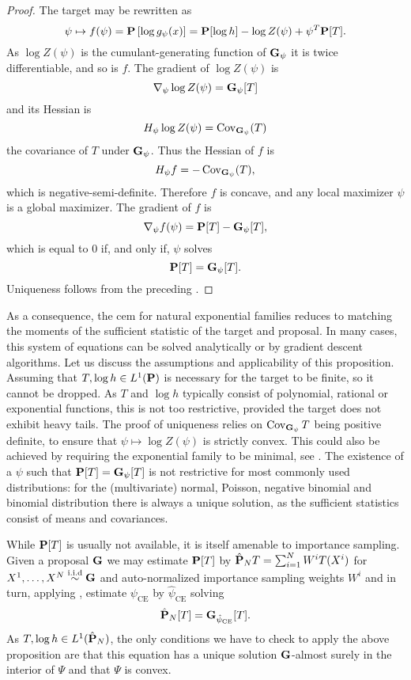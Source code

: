 \begin{proof}
    The target may be rewritten as
    $$
    \psi \mapsto f(\psi) = \P \left[\log g_{\psi}(x)\right]= \P [\log h] - \log Z(\psi) + \psi^{T} \P [T].
    $$
    As $\log Z(\psi)$ is the cumulant-generating function of $\G_{\psi}$ it is twice differentiable, and so is $f$. The gradient of $\log Z(\psi)$ is 
    $$
    \nabla_{\psi} \log Z(\psi) = \G_{\psi} [T]
    $$
    and its Hessian is 
    $$
    H_{\psi} \log Z(\psi) = \cov_{\G_{\psi}} (T)
    $$
    the covariance of $T$ under $\G_{\psi}$. Thus the Hessian of $f$ is 
    $$
    H_{\psi} f = - \cov_{\G_{\psi}} (T),
    $$
    which is negative-semi-definite. Therefore $f$ is concave, and any local maximizer $\psi$ is a global maximizer. The gradient of $f$ is 
    $$
        \nabla_{\psi} f(\psi) = \P[T] - \G_{\psi} [T],
    $$
    which is equal to $0$ if, and only if, $\psi$ solves 
    $$
    \P[T] = \G_{\psi}[T].
    $$
    Uniqueness follows from the preceding .
\end{proof}
As a consequence, the \acrshort{cem} for natural exponential families reduces to matching the moments of the sufficient statistic of the target and proposal.
In many cases, this system of equations can be solved analytically or by gradient descent algorithms.
Let us discuss the assumptions and applicability of this proposition. Assuming that $T, \log h \in L^{1}(\P)$ is necessary for the target to be finite, so it cannot be dropped. As $T$ and $\log h$ typically consist of polynomial, rational or exponential functions, this is not too restrictive, provided the target does not exhibit heavy tails. The proof of uniqueness relies on $\cov_{\G_{\psi}} T$ being positive definite, to ensure that $\psi \mapsto \log Z(\psi)$ is strictly convex. This could also be achieved by requiring the exponential family to be minimal, see \citep[Theorem 1.13 (iv)]{Brown1986Fundamentals}. The existence of a $\psi$ such that $\P [T] = \G_{\psi} [T]$ is not restrictive for most commonly used distributions: for the (multivariate) normal, Poisson, negative binomial and binomial distribution there is always a unique solution, as the sufficient statistics consist of means and covariances. 

While $\P [T]$ is usually not available, it is itself amenable to importance sampling. Given a proposal $\G$ we may estimate $\P [T]$ by $\hat\P_N T = \sum_{i = 1}^{N} W^{i} T(X^{i})$ for $X^{1}, \dots, X^{N} \iid \G$ and auto-normalized importance sampling weights $W^{i}$ and in turn, applying , estimate $\psi_{\text{CE}}$ by $\hat \psi_{\text{CE}}$ solving
\begin{equation}
    \label{eq:ee_hpce}
\hat \P_N [T] = \G_{\hpce} [T].
\end{equation}
As $T, \log h \in L^{1}(\hat \P_{N})$, the only conditions we have to check to apply the above proposition are that this equation has a unique solution $\G$-almost surely in the interior of $\Psi$ and that $\Psi$ is convex. 

